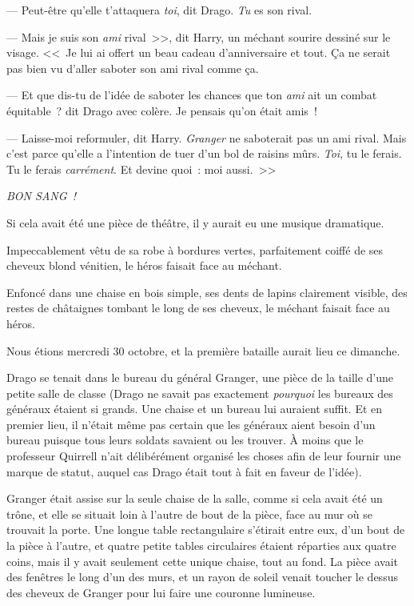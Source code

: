 --- Peut-être qu'elle t'attaquera \emph{toi}, dit Drago. \emph{Tu} es son rival.

--- Mais je suis son \emph{ami} rival~>>, dit Harry, un méchant sourire dessiné sur le visage. <<~Je lui ai offert un beau cadeau d'anniversaire et tout. Ça ne serait pas bien vu d'aller saboter son ami rival comme ça.

--- Et que dis-tu de l'idée de saboter les chances que ton \emph{ami} ait un combat équitable~? dit Drago avec colère. Je pensais qu'on était amis~!

--- Laisse-moi reformuler, dit Harry. \emph{Granger} ne saboterait pas un ami rival. Mais c'est parce qu'elle a l'intention de tuer d'un bol de raisins mûrs. \emph{Toi}, tu le ferais. Tu le ferais \emph{carrément}. Et devine quoi~: moi aussi.~>>

\emph{BON SANG~!}

\later

Si cela avait été une pièce de théâtre, il y aurait eu une musique dramatique.

Impeccablement vêtu de sa robe à bordures vertes, parfaitement coiffé de ses cheveux blond vénitien, le héros faisait face au méchant.

Enfoncé dans une chaise en bois simple, ses dents de lapins clairement visible, des restes de châtaignes tombant le long de ses cheveux, le méchant faisait face au héros.

Nous étions mercredi 30 octobre, et la première bataille aurait lieu ce dimanche.

Drago se tenait dans le bureau du général Granger, une pièce de la taille d'une petite salle de classe (Drago ne savait pas exactement \emph{pourquoi} les bureaux des généraux étaient si grands. Une chaise et un bureau lui auraient suffit. Et en premier lieu, il n'était même pas certain que les généraux aient besoin d'un bureau puisque tous leurs soldats savaient ou les trouver. À moins que le professeur Quirrell n'ait délibérément organisé les choses afin de leur fournir une marque de statut, auquel cas Drago était tout à fait en faveur de l'idée).

Granger était assise sur la seule chaise de la salle, comme si cela avait été un trône, et elle se situait loin à l'autre de bout de la pièce, face au mur où se trouvait la porte. Une longue table rectangulaire s'étirait entre eux, d'un bout de la pièce à l'autre, et quatre petite tables circulaires étaient réparties aux quatre coins, mais il y avait seulement cette unique chaise, tout au fond. La pièce avait des fenêtres le long d'un des murs, et un rayon de soleil venait toucher le dessus des cheveux de Granger pour lui faire une couronne lumineuse.

